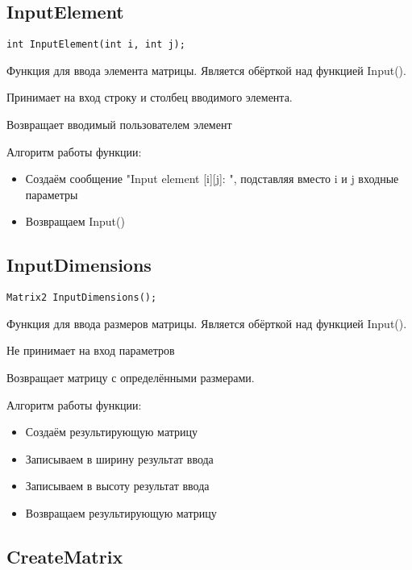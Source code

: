 \subsection*{InputElement}

\begin{lstlisting}[label={lst:InputElement}]
	int InputElement(int i, int j);
\end{lstlisting}

Функция для ввода элемента матрицы.
Является обёрткой над функцией Input().

Принимает на вход строку и столбец вводимого элемента.

Возвращает вводимый пользователем элемент

Алгоритм работы функции:

\begin{itemize}
	\item Создаём сообщение "Input element [i][j]: ", подставляя вместо i и j входные параметры
	\item Возвращаем Input()
\end{itemize}

\subsection*{InputDimensions}

\begin{lstlisting}[label={lst:InputDimensions}]
	Matrix2 InputDimensions();
\end{lstlisting}

Функция для ввода размеров матрицы.
Является обёрткой над функцией Input().

Не принимает на вход параметров

Возвращает матрицу с определёнными размерами.

Алгоритм работы функции:

\begin{itemize}
	\item Создаём результирующую матрицу
	\item Записываем в ширину результат ввода
	\item Записываем в высоту результат ввода
	\item Возвращаем результирующую матрицу
\end{itemize}

\subsection*{CreateMatrix}

